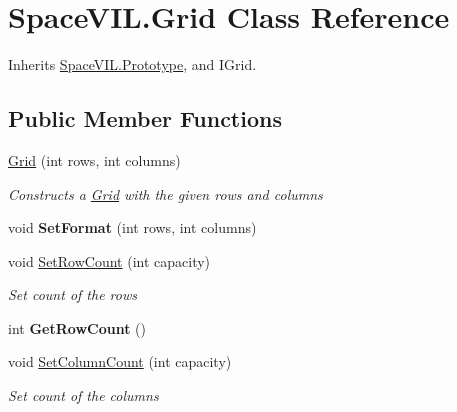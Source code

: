 \hypertarget{class_space_v_i_l_1_1_grid}{}\section{Space\+V\+I\+L.\+Grid Class Reference}
\label{class_space_v_i_l_1_1_grid}


Inherits \mbox{\hyperlink{class_space_v_i_l_1_1_prototype}{Space\+V\+I\+L.\+Prototype}}, and I\+Grid.

\subsection*{Public Member Functions}
\begin{DoxyCompactItemize}
\item 
\mbox{\hyperlink{class_space_v_i_l_1_1_grid_a43f2e279b402d3f37abaf7407cb10359}{Grid}} (int rows, int columns)
\begin{DoxyCompactList}\small\item\em Constructs a \mbox{\hyperlink{class_space_v_i_l_1_1_grid}{Grid}} with the given rows and columns \end{DoxyCompactList}\item 
\mbox{\label{class_space_v_i_l_1_1_grid_aec0c6b809ef355c95f2fbbd7608a8f2e}} 
void {\bfseries Set\+Format} (int rows, int columns)
\item 
void \mbox{\hyperlink{class_space_v_i_l_1_1_grid_a62b1f61a50a5cceefcee8c881f92e641}{Set\+Row\+Count}} (int capacity)
\begin{DoxyCompactList}\small\item\em Set count of the rows \end{DoxyCompactList}\item 
\mbox{\label{class_space_v_i_l_1_1_grid_a0306b68151d5d100ac90d298fcd67b6f}} 
int {\bfseries Get\+Row\+Count} ()
\item 
void \mbox{\hyperlink{class_space_v_i_l_1_1_grid_a601c091730701ac3e117396686c9904d}{Set\+Column\+Count}} (int capacity)
\begin{DoxyCompactList}\small\item\em Set count of the columns \end{DoxyCompactList}\item 
\mbox{\label{class_space_v_i_l_1_1_grid_a60c46214dcaaaf36ea21ebf29dcba72a}} 

\end{DoxyCompactItemize}
